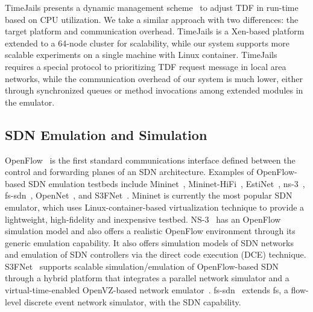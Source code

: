 TimeJails \cite{TimeJails} presents a dynamic management scheme~\cite{NtwkEmultAdaptVirtTime} to adjust TDF in run-time based on CPU utilization. 
We take a similar approach with two differences: the target platform and communication overhead.
TimeJails is a Xen-based platform extended to a 64-node cluster for scalability,
while our system supports more scalable experiments on a single machine with Linux container.
TimeJails requires a special protocol to prioritizing TDF request message in local area networks,
while the communication overhead of our system is much lower, either through synchronized queues or method invocations among extended modules in the emulator.

\subsection{SDN Emulation and Simulation}
OpenFlow~\cite{Openflow} is the first standard communications interface defined between the control and forwarding planes of an SDN architecture. 
Examples of OpenFlow-based SDN emulation testbeds include Mininet~\cite{LaptopSDN},
Mininet-HiFi~\cite{ReproNetExprCBE}, EstiNet~\cite{EstiNet}, ns-3~\cite{NS-3}, fs-sdn~\cite{FSSDN}, OpenNet~\cite{OpenNet}, and S3FNet~\cite{jin2013parallel}.
Mininet is currently the most popular SDN emulator, which uses Linux-container-based virtualization technique to provide a lightweight, high-fidelity and inexpensive testbed.
NS-3~\cite{NS-3} has an OpenFlow simulation model and also offers a realistic OpenFlow environment through its generic emulation capability.
It also offers simulation models of SDN networks and emulation of SDN controllers via the direct code execution (DCE) technique.
S3FNet~\cite{jin2013parallel} supports scalable simulation/emulation of OpenFlow-based SDN through
a hybrid platform that integrates a parallel network simulator and a virtual-time-enabled OpenVZ-based network emulator~\cite{S3FWebsite}.
fs-sdn~\cite{FSSDN} extends fs, a flow-level discrete event network simulator, with the SDN capability.
